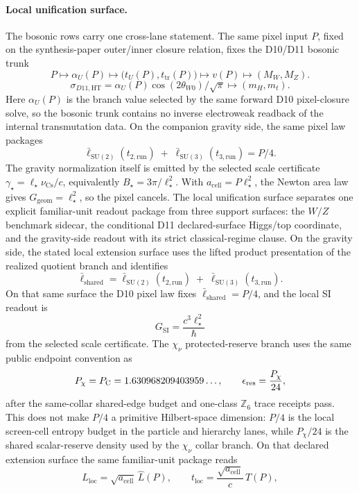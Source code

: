 \documentclass[11pt]{article}
\newcommand{\ellbar}{\bar{\ell}}
\begin{document}
\paragraph{Local unification surface.}
The bosonic rows carry one cross-lane statement. The same pixel input \(P\), fixed on the
synthesis-paper outer/inner closure relation, fixes the
D10/D11 bosonic trunk
\[
P
\longmapsto
\alpha_U(P)
\longmapsto
\bigl(t_U(P),t_{\mathrm{tr}}(P)\bigr)
\longmapsto
v(P)
\longmapsto
\left(M_W,M_Z\right).
\]
\[
\sigma_{D11,\mathrm{HT}}
=
\alpha_U(P)\cos(2\theta_{W0})/\sqrt{\pi}
\longmapsto
\left(m_H,m_t\right).
\]
Here \(\alpha_U(P)\) is the branch value selected by the same forward D10 pixel-closure solve, so
the bosonic trunk contains no inverse electroweak readback of the internal transmutation data.
On the companion gravity side, the same pixel law packages
\[
\ellbar_{\mathrm{SU(2)}}(t_{2,\mathrm{run}})
\;+\;
\ellbar_{\mathrm{SU(3)}}(t_{3,\mathrm{run}})
=
P/4.
\]
The gravity normalization itself is emitted by the selected scale certificate
\(\gamma_\star=\ell_\star\nu_{\mathrm{Cs}}/c\), equivalently
\(B_\star=3\pi/\ell_\star^2\). With
\(a_{\mathrm{cell}}=P\ell_\star^2\), the Newton area law gives
\(G_{\mathrm{geom}}=\ell_\star^2\), so the pixel cancels.
The local unification surface separates one explicit familiar-unit readout package from three
support surfaces: the \(W/Z\) benchmark sidecar, the conditional D11
declared-surface Higgs/top coordinate,
and the gravity-side readout with its strict classical-regime clause.
On the gravity side, the stated local extension surface uses the lifted product presentation of the
realized quotient branch and identifies
\[
\ellbar_{\mathrm{shared}}
=
\ellbar_{\mathrm{SU(2)}}(t_{2,\mathrm{run}})
\;+\;
\ellbar_{\mathrm{SU(3)}}(t_{3,\mathrm{run}}).
\]
On that same surface the D10 pixel law fixes \(\ellbar_{\mathrm{shared}}=P/4\),
and the local SI readout is
\[
G_{\mathrm{SI}}=\frac{c^3\ell_\star^2}{\hbar}
\]
from the selected scale certificate. The \(\chi_\nu\) protected-reserve branch
uses the same public endpoint convention as
\[
P_\chi=P_{\mathrm C}=1.630968209403959\ldots ,
\qquad
\epsilon_{\rm res}=\frac{P_\chi}{24},
\]
after the same-collar shared-edge budget and one-class \(\mathbb Z_6\) trace
receipts pass. This does not make \(P/4\) a primitive Hilbert-space dimension:
\(P/4\) is the local screen-cell entropy budget in the particle and hierarchy
lanes, while \(P_\chi/24\) is the shared scalar-reserve density used by the
\(\chi_\nu\) collar branch. On that declared extension surface the same
familiar-unit package reads
\[
L_{\mathrm{loc}}=\sqrt{a_{\mathrm{cell}}}\,\widehat L(P),
\qquad
t_{\mathrm{loc}}=\frac{\sqrt{a_{\mathrm{cell}}}}{c}\,\widehat T(P),
\]
\end{document}
